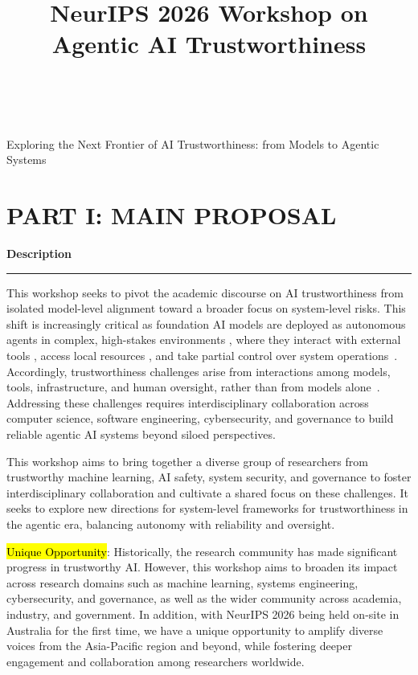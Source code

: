 \documentclass{article}
\title{\large NeurIPS 2026 Workshop on Agentic AI Trustworthiness\\
\large \textit{\mdseries{Sydney, Australia 6-12 December 2026}}\large\normalfont~\raisebox{-0.1em}{[\ding{43}~\href{https://a5507203.github.io/neurips-agentic-ai-workshop/}{\hl{website}}]}}
\author{}
\date{}
\newcommand{\sectiontitle}[1]{\noindent\textbf{\textcolor{neuripsblue}{#1}}\vspace{0.1cm}\hrule\vspace{0.2cm}}
\begin{document}
\maketitle
\vspace{-7em}
\begin{advertisement}
Exploring the Next Frontier of AI Trustworthiness: from Models to Agentic Systems
\end{advertisement}

\section*{\textcolor{neuripsblue}{\large PART I: MAIN PROPOSAL}}
\vspace{-7pt}
\sectiontitle{Description}
\vspace{-2pt}

This workshop seeks to pivot the academic discourse on AI trustworthiness from isolated model-level alignment toward a broader focus on system-level risks. This shift is increasingly critical as foundation AI models are deployed as autonomous agents in complex, high-stakes environments \cite{anthropic_claudecode_2025, openai_codex_system}, where they interact with external tools \cite{schick2023toolformer}, access local resources \cite{yang2024sweagent}, and take partial control over system operations~\cite{li2026les}. Accordingly, trustworthiness challenges arise from interactions among models, tools, infrastructure, and human oversight, rather than from models alone~\cite{deng2024aiagents,kim2026attackdefense}. Addressing these challenges requires interdisciplinary collaboration across computer science, software engineering, cybersecurity, and governance to build reliable agentic AI systems beyond siloed perspectives.


This workshop aims to bring together a diverse group of researchers from trustworthy machine learning, AI safety, system security, and governance to foster interdisciplinary collaboration and cultivate a shared focus on these challenges. It seeks to explore new directions for system-level frameworks for trustworthiness in the agentic era, balancing autonomy with reliability and oversight.

\hl{Unique Opportunity}: Historically, the research community has made significant progress in trustworthy AI. However, this workshop aims to broaden its impact across research domains such as machine learning, systems engineering, cybersecurity, and governance, as well as the wider community across academia, industry, and government. In addition, with NeurIPS 2026 being held on-site in Australia for the first time, we have a unique opportunity to amplify diverse voices from the Asia-Pacific region and beyond, while fostering deeper engagement and collaboration among researchers worldwide.
\end{document}
